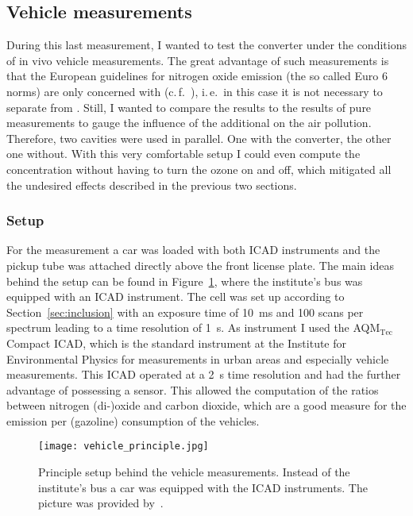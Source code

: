 \subsection{Vehicle measurements}
\label{sec:vehicle}

During this last measurement, I wanted to test the converter under the
conditions of in vivo vehicle measurements. The great advantage of
such measurements is that the European guidelines for nitrogen oxide
emission (the so called Euro 6 norms) are only concerned with
 (c.\,f.~\cite{eu}), i.\,e.\ in this case it is not necessary
to separate  from . Still, I wanted to compare the
 results to the results of pure  measurements to
gauge the influence of the additional  on the air
pollution. Therefore, two cavities were used in parallel. One with the
converter, the other one without. With this very comfortable setup I
could even compute the  concentration without having to turn
the ozone on and off, which mitigated all the undesired effects
described in the previous two sections.

\subsubsection{Setup}
\label{sec:vehicle-setup}

For the measurement a car was loaded with both ICAD instruments and
the pickup tube was attached directly above the front license
plate. The main ideas behind the setup can be found in
Figure~\ref{fig:hd-principle}, where the institute's bus was equipped
with an ICAD instrument. The  cell was set up according to
Section~\ref{sec:inclusion} with an exposure time of
\SI{10}{\milli\second} and 100 scans per spectrum leading to a time
resolution of \SI{1}{\second}. As  instrument I used the
AQM$_{\text{Tec}}$ Compact ICAD, which is the standard instrument at
the Institute for Environmental Physics for  measurements in
urban areas and especially vehicle measurements. This  ICAD
operated at a \SI{2}{\second} time resolution and had the further
advantage of possessing a  sensor. This allowed the
computation of the ratios between nitrogen (di-)oxide and carbon
dioxide, which are a good measure for the emission per (gazoline)
consumption of the vehicles.

\begin{figure}[htbp]
  \centering
  \texttt{[image: vehicle\_principle.jpg]}
  \caption{Principle setup behind the vehicle measurements. Instead of
    the institute's bus a car was equipped with the ICAD
    instruments. The picture was provided by~\cite{denis}.}
  \label{fig:hd-principle}
\end{figure}

